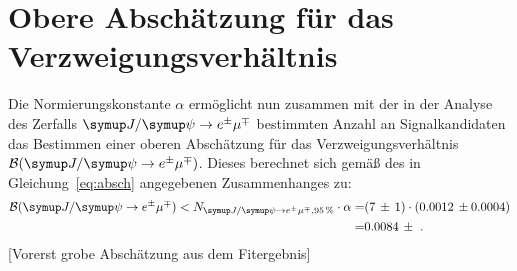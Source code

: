 \section{Obere Abschätzung für das Verzweigungsverhältnis}
Die Normierungskonstante $\alpha$ ermöglicht nun zusammen mit der in der Analyse des Zerfalls $\signal$ bestimmten Anzahl an Signalkandidaten das Bestimmen einer oberen Abschätzung für das Verzweigungsverhältnis $\mathcal{B}(\signal)$. Dieses berechnet sich gemäß des in Gleichung~\eqref{eq:absch} angegebenen Zusammenhanges zu:
%
\begin{equation}
  \begin{split}
    \mathcal{B}(\signal)<N_{\signal, \SI{95}{\percent}}\cdot\alpha=& (7\,\pm\,1)\cdot(0.0012\,\pm0.0004)\\=& 0.0084\,\pm\, \, .
  \end{split}
\end{equation}
%
[Vorerst grobe Abschätzung aus dem Fitergebnis]

\nocite{biblatex, make, toolbox, gitbash, siunitx}
